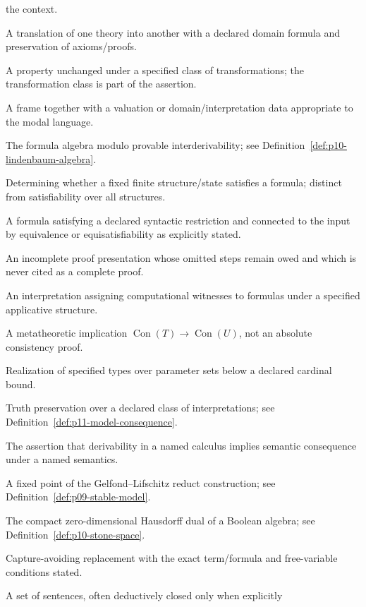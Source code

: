 \begin{description}[style=nextline,leftmargin=0pt]
the context.
\item[interpretation of theories] A translation of one theory into another
with a declared domain formula and preservation of axioms/proofs.
\item[invariant] A property unchanged under a specified class of transformations;
the transformation class is part of the assertion.
\item[Kripke model] A frame together with a valuation or domain/interpretation
data appropriate to the modal language.
\item[Lindenbaum--Tarski algebra] The formula algebra modulo provable
interderivability; see Definition~\ref{def:p10-lindenbaum-algebra}.
\item[model checking] Determining whether a fixed finite structure/state
satisfies a formula; distinct from satisfiability over all structures.
\item[normal form] A formula satisfying a declared syntactic restriction and
connected to the input by equivalence or equisatisfiability as explicitly stated.
\item[proof sketch] An incomplete proof presentation whose omitted steps remain
owed and which is never cited as a complete proof.
\item[realizability] An interpretation assigning computational witnesses to
formulas under a specified applicative structure.
\item[relative consistency] A metatheoretic implication
\(\operatorname{Con}(T)\to\operatorname{Con}(U)\), not an absolute consistency proof.
\item[saturation] Realization of specified types over parameter sets below a
declared cardinal bound.
\item[semantic consequence] Truth preservation over a declared class of
interpretations; see Definition~\ref{def:p11-model-consequence}.
\item[soundness] The assertion that derivability in a named calculus implies
semantic consequence under a named semantics.
\item[stable model] A fixed point of the Gelfond--Lifschitz reduct construction;
see Definition~\ref{def:p09-stable-model}.
\item[Stone space] The compact zero-dimensional Hausdorff dual of a Boolean
algebra; see Definition~\ref{def:p10-stone-space}.
\item[substitution] Capture-avoiding replacement with the exact term/formula
and free-variable conditions stated.
\item[theory] A set of sentences, often deductively closed only when explicitly

\end{description}
